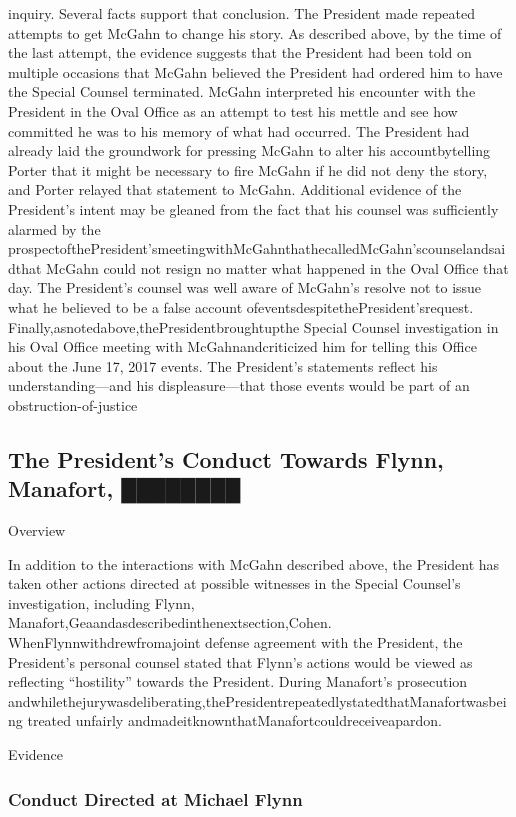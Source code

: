 inquiry.
Several facts support that conclusion. The President made repeated attempts to get McGahn to change his story. As described above, by the time of the last attempt, the evidence suggests that the President had been told on multiple occasions that McGahn believed the President had ordered him to have the Special Counsel terminated. McGahn interpreted his encounter with the President in the Oval Office as an attempt to test his mettle and see how committed he was to his memory of what had occurred. The President had already laid the groundwork for pressing McGahn to alter his accountbytelling Porter that it might be necessary to fire McGahn if he did not deny the story, and Porter relayed that statement to McGahn. Additional evidence of the President's intent may be gleaned from the fact that his counsel was sufficiently alarmed by the prospectofthePresident'smeetingwithMcGahnthathecalledMcGahn'scounselandsaidthat McGahn could not resign no matter what happened in the Oval Office that day. The President's counsel was well aware of McGahn's resolve not to issue what he believed to be a false account ofeventsdespitethePresident'srequest. Finally,asnotedabove,thePresidentbroughtupthe Special Counsel investigation in his Oval Office meeting with McGahnandcriticized him for telling this Office about the June 17, 2017 events. The President's statements reflect his understanding—and his displeasure—that those events would be part of an obstruction-of-justice

\subsection{The President's Conduct Towards Flynn, Manafort, ████████}

Overview

In addition to the interactions with McGahn described above, the President has taken other actions directed at possible witnesses in the Special Counsel's investigation, including Flynn, Manafort,Geaandasdescribedinthenextsection,Cohen. WhenFlynnwithdrewfromajoint defense agreement with the President, the President's personal counsel stated that Flynn's actions would be viewed as reflecting “hostility” towards the President. During Manafort's prosecution andwhilethejurywasdeliberating,thePresidentrepeatedlystatedthatManafortwasbeing treated unfairly andmadeitknownthatManafortcouldreceiveapardon.

Evidence

\subsubsection{Conduct Directed at Michael Flynn}

